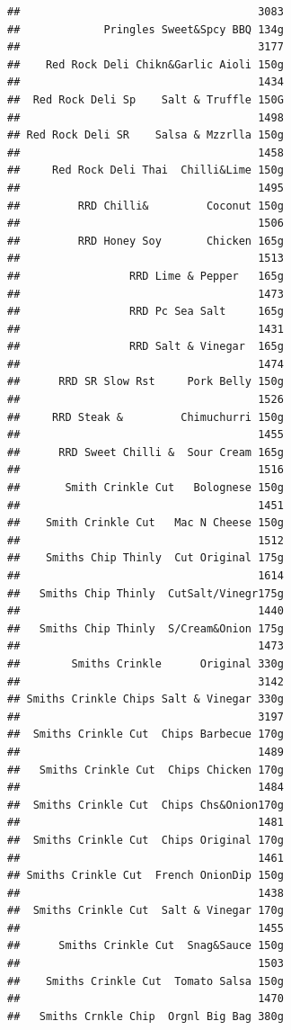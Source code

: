 \documentclass[
]{article}
\begin{document}
\begin{verbatim}
##                                     3083 
##             Pringles Sweet&Spcy BBQ 134g 
##                                     3177 
##    Red Rock Deli Chikn&Garlic Aioli 150g 
##                                     1434 
##  Red Rock Deli Sp    Salt & Truffle 150G 
##                                     1498 
## Red Rock Deli SR    Salsa & Mzzrlla 150g 
##                                     1458 
##     Red Rock Deli Thai  Chilli&Lime 150g 
##                                     1495 
##         RRD Chilli&         Coconut 150g 
##                                     1506 
##         RRD Honey Soy       Chicken 165g 
##                                     1513 
##                 RRD Lime & Pepper   165g 
##                                     1473 
##                 RRD Pc Sea Salt     165g 
##                                     1431 
##                 RRD Salt & Vinegar  165g 
##                                     1474 
##      RRD SR Slow Rst     Pork Belly 150g 
##                                     1526 
##     RRD Steak &         Chimuchurri 150g 
##                                     1455 
##      RRD Sweet Chilli &  Sour Cream 165g 
##                                     1516 
##       Smith Crinkle Cut   Bolognese 150g 
##                                     1451 
##    Smith Crinkle Cut   Mac N Cheese 150g 
##                                     1512 
##    Smiths Chip Thinly  Cut Original 175g 
##                                     1614 
##   Smiths Chip Thinly  CutSalt/Vinegr175g 
##                                     1440 
##   Smiths Chip Thinly  S/Cream&Onion 175g 
##                                     1473 
##        Smiths Crinkle      Original 330g 
##                                     3142 
## Smiths Crinkle Chips Salt & Vinegar 330g 
##                                     3197 
##  Smiths Crinkle Cut  Chips Barbecue 170g 
##                                     1489 
##   Smiths Crinkle Cut  Chips Chicken 170g 
##                                     1484 
##  Smiths Crinkle Cut  Chips Chs&Onion170g 
##                                     1481 
##  Smiths Crinkle Cut  Chips Original 170g 
##                                     1461 
## Smiths Crinkle Cut  French OnionDip 150g 
##                                     1438 
##  Smiths Crinkle Cut  Salt & Vinegar 170g 
##                                     1455 
##      Smiths Crinkle Cut  Snag&Sauce 150g 
##                                     1503 
##    Smiths Crinkle Cut  Tomato Salsa 150g 
##                                     1470 
##   Smiths Crnkle Chip  Orgnl Big Bag 380g 

\end{verbatim}
\end{document}
